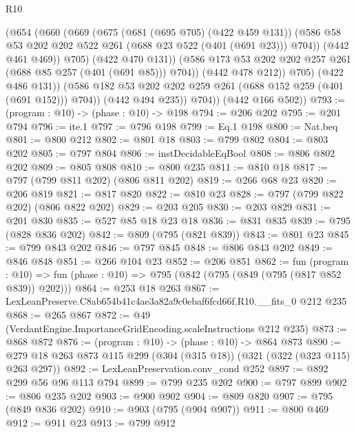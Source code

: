\begin{lexlean}{R10}
\begin{coremodule}
                      (@654
                        (@660
                          (@669
                            (@675
                              (@681 (@695 @705) (@422 @459 @131))
                              (@586
                                @58
                                @53
                                @202
                                @202
                                @522
                                @261
                                (@688 @23 @522 (@401 (@691 @23)))
                                @704))
                            (@442 @461 @469))
                          @705)
                        (@422 @470 @131))
                      (@586 @173 @53 @202 @202 @257 @261 (@688 @85 @257 (@401 (@691 @85))) @704))
                    (@442 @478 @212))
                  @705)
                (@422 @486 @131))
              (@586 @182 @53 @202 @202 @259 @261 (@688 @152 @259 (@401 (@691 @152))) @704))
            (@442 @494 @235))
          @704))
      (@442 @166 @502))
@793 := (program : @10) -> (phase : @10) -> @198
@794 := @206 @202
@795 := @201 @794
@796 := ite.{1}
@797 := @796 @198
@799 := Eq.{1} @198
@800 := Nat.beq
@801 := @800 @212
@802 := @801 @18
@803 := @799 @802
@804 := @803 @202
@805 := @797 @804
@806 := instDecidableEqBool
@808 := @806 @802 @202
@809 := @805 @808
@810 := @800 @235
@811 := @810 @18
@817 := @797 (@799 @811 @202) (@806 @811 @202)
@819 := @266 @68 @23
@820 := @206 @819
@821 := @817 @820
@822 := @810 @23
@828 := @797 (@799 @822 @202) (@806 @822 @202)
@829 := @203 @205
@830 := @203 @829
@831 := @201 @830
@835 := @527 @85 @18 @23 @18
@836 := @831 @835
@839 := @795 (@828 @836 @202)
@842 := @809 (@795 (@821 @839))
@843 := @801 @23
@845 := @799 @843 @202
@846 := @797 @845
@848 := @806 @843 @202
@849 := @846 @848
@851 := @266 @104 @23
@852 := @206 @851
@862 := fun (program : @10) =>
  fun (phase : @10) => @795 (@842 (@795 (@849 (@795 (@817 @852 @839)) @202)))
@864 := @253 @18 @263
@867 := LexLeanPreserve.C8ab654b41c4ae3a82a9c0ebaf6fcd66f.R10.__fits_0 @212 @235
@868 := @265 @867
@872 := @49 (VerdantEngine.ImportanceGridEncoding.scaleInstructions @212 @235)
@873 := @868 @872
@876 := (program : @10) -> (phase : @10) -> @864 @873
@890 := @279 @18 @263 @873 @115 @299 (@304 (@315 @18)) (@321 (@322 (@323 @115) @263 @297))
@892 := LexLeanPreservation.conv_cond @252
@897 := @892 @299 @56 @96 @113 @794
@899 := @799 @235 @202
@900 := @797 @899
@902 := @806 @235 @202
@903 := @900 @902
@904 := @809 @820
@907 := @795 (@849 @836 @202)
@910 := @903 (@795 (@904 @907))
@911 := @800 @469
@912 := @911 @23
@913 := @799 @912

\end{coremodule}
\end{lexlean}
